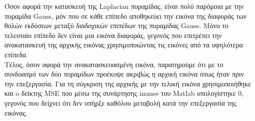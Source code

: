 \documentclass{article}
\begin{document}
	\pagebreak
	\noindent
	Όσον αφορά την κατασκευή της Laplacian πυραμίδας, είναι πολύ παρόμοια με την πυραμίδα Gauss, μόν που σε κάθε επίπεδο αποθηκεύει την εικόνα της διαφοράς των θολών εκδόσεων μεταξύ διαδοχικών επιπέδων της πυραμίδας Gauss. Μόνο το τελευταίο επίπεδο δεν είναι μια εικόνα διαφοράς, γεγονός που επιτρέπει την ανακατασκευή της αρχικής εικόνας χρησιμοποιώντας τις εικόνες από τα υψηλότερα επίπεδα.\\
	
	\noindent
	Τέλος, όσον αφορά την ανακατασκευασμένη εικόνα, παρατηρούμε ότι με το συνδυασμό των δύο πυραμίδων προέκυψε ακριβώς η αρχική εικόνα όπως ήταν πριν την επεξεργασία. Για τη σύγκριση της αρχικής με την τελική εικόνα χρησιμοποιήθηκε και o δείκτης MSE που μέσω της συνάρτησης immse του Matlab υπολογίστηκε 0, γεγονός που δείχνει ότι δεν υπήρξε καθόλου μεταβολή κατά την επεξεργασία της εικόνας.
\end{document}
